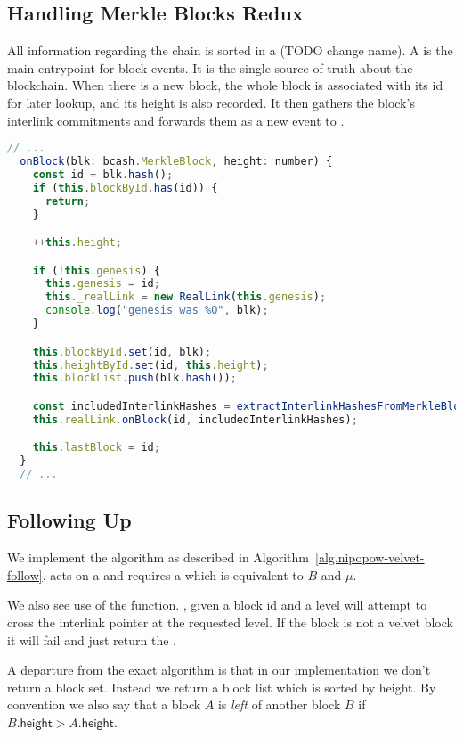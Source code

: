 \subsection{Handling Merkle Blocks Redux}
All information regarding the chain is sorted in a  (TODO change name). A  is the main entrypoint for block events. It is the single source of truth about the blockchain. When there is a new block, the whole block is associated with its id for later lookup, and its height is also recorded. It then gathers the block's interlink commitments and forwards them as a new event to .

\begin{lstlisting}[language=Javascript]
  // ...
  onBlock(blk: bcash.MerkleBlock, height: number) {
    const id = blk.hash();
    if (this.blockById.has(id)) {
      return;
    }

    ++this.height;

    if (!this.genesis) {
      this.genesis = id;
      this._realLink = new RealLink(this.genesis);
      console.log("genesis was %O", blk);
    }

    this.blockById.set(id, blk);
    this.heightById.set(id, this.height);
    this.blockList.push(blk.hash());

    const includedInterlinkHashes = extractInterlinkHashesFromMerkleBlock(blk);
    this.realLink.onBlock(id, includedInterlinkHashes);

    this.lastBlock = id;
  }
  // ...
\end{lstlisting}

\subsection{Following Up}
We implement the  algorithm as described in Algorithm~\ref{alg.nipopow-velvet-follow}.  acts on a  and requires a  which is equivalent to $B$ and $\mu$.

We also see use of the  function. , given a block id and a level will attempt to cross the interlink pointer at the requested level. If the block is not a velvet block it will fail and just return the .

A departure from the exact algorithm is that in our implementation we don't return a block set. Instead we return a block list which is sorted by height. By convention we also say that a block $A$ is \textit{left} of another block $B$ if $B.\mathsf{height} > A.\mathsf{height}$.

